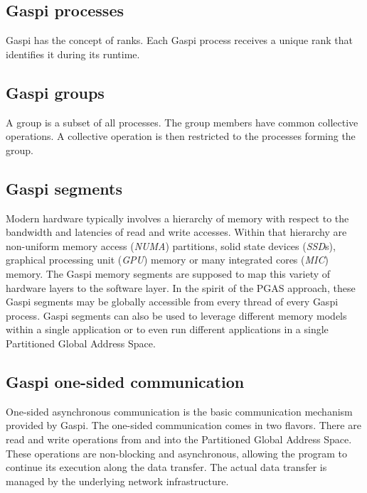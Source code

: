 \documentclass[a4paper]{article}
\newlength{\st}\setlength{\st}{0pt}
\newcommand{\GASPI}{{\sc Gaspi}}
\begin{document}
\subsection{\GASPI{} processes}


\GASPI{} has the concept of ranks. Each \GASPI{} process receives
a unique rank that identifies it during its runtime.

\subsection{\GASPI{} groups}

A group is a subset of all processes. The group members
have common collective operations. A collective operation is then
restricted to the processes forming the group.

\subsection{\GASPI{} segments}

Modern hardware typically involves a hierarchy of memory with respect to the
bandwidth and latencies of read and write accesses. Within that hierarchy are
non-uniform memory access (\emph{NUMA}) partitions, solid state
devices (\emph{SSD}s), graphical processing unit (\emph{GPU}) memory
or many integrated cores (\emph{MIC}) memory.  The \GASPI{} memory
segments are supposed to map this variety of hardware layers to the software
layer. In the spirit of the PGAS approach, these \GASPI{} segments
may be globally accessible from every thread of every \GASPI{} process.
\GASPI{} segments can also be used to leverage different memory models within
a single application or to even run different applications in a single Partitioned Global
Address Space.

\subsection{\GASPI{} one-sided communication}

One-sided asynchronous communication is the basic communication
mechanism provided by \GASPI{}. The one-sided communication comes
in two flavors.  There are read and write operations from and into the
Partitioned Global Address Space. These
operations are non-blocking and asynchronous, allowing the program to continue
its execution along the data transfer. The actual data transfer is managed
by the underlying network infrastructure.
\end{document}
